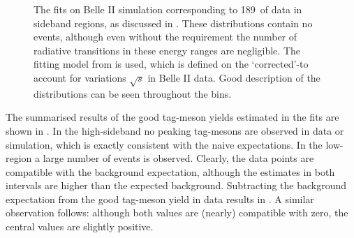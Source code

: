 \begin{figure}[htbp!]
    \centering
    \caption{\label{fig:sideband_mc_fit}    
    The \Mbc fits on Belle II simulation corresponding to 189~\invfb of data in \EB sideband regions,
    as discussed in .
    These distributions contain no \BtoXsgamma events, although even without the requirement the number of radiative transitions in these energy ranges are negligible.
    The fitting model from  is used,
    which is defined on the `corrected'-\Mbc to account for variations $\sqrt{s}$ in Belle II data.
    Good description of the \Mbc distributions can be seen throughout the \EB bins.
    }
\end{figure}

The summarised results of the good tag-\B meson yields estimated in the \Mbc fits are shown in .
In the high-\EB sideband no peaking tag-\B mesons are observed in data or simulation, which is exactly consistent with the naive expectations.
In the low-\EB region a large number of events is observed.
Clearly, the data points are compatible with the background expectation, although the estimates in both intervals are higher than the expected background.
Subtracting the background expectation from the good tag-\B meson yield in data results in .
A similar observation follows: although both values are (nearly) compatible with zero,
the central values are slightly positive.

